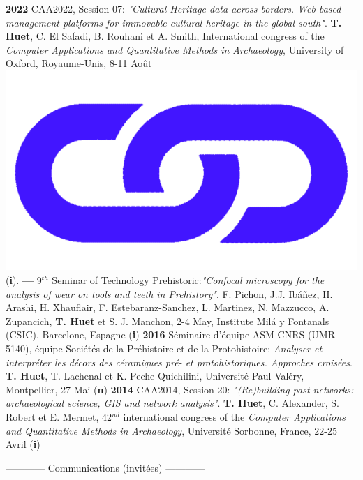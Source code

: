 \documentclass{article}
\newcommand{\fr}[1]{#1}       %
\newcommand{\en}[1]{}     %
\begin{document}
\textbf{2022 }CAA2022, Session 07: \textit{"Cultural Heritage data across borders. Web-based management platforms for immovable cultural heritage in the global south"}. \textbf{T. Huet}, C. El Safadi, B. Rouhani et A. Smith, International congress of the \textit{Computer Applications and Quantitative Methods in Archaeology}, University of Oxford, Royaume-Unis, 8-11 Août \href{https://eamena-project.github.io/reveal.js/projects/caa22s07.html}{\includegraphics[scale=0.015]{link_darkblue.png}} (\textbf{i}). 
\smallbreak
\textbf{--- }9${}^{th}$ Seminar of Technology Prehistoric:\textit{"Confocal microscopy for the analysis of wear on tools and teeth in Prehistory"}. F. Pichon, J.J. Ibáñez, H. Arashi, H. Xhauflair, F. Estebaranz-Sanchez, L. Martinez, N. Mazzucco, A. Zupancich, \textbf{T. Huet} et S. J. Manchon, 2-4 May, Institute Milá y Fontanals (CSIC), Barcelone, Espagne (\textbf{i})
\smallbreak
\textbf{2016 }S\'{e}minaire d'\'{e}quipe ASM-CNRS (UMR 5140), \'{e}quipe Soci\'{e}t\'{e}s de la Pr\'{e}histoire et de la Protohistoire: \textit{Analyser et interpr\'{e}ter les d\'{e}cors des c\'{e}ramiques pr\'{e}- et protohistoriques. Approches crois\'{e}es}. \textbf{T. Huet}, T. Lachenal et K. Peche-Quichilini, Universit\'{e} Paul-Val\'{e}ry, Montpellier, 27 Mai (\textbf{n})
\smallbreak
\textbf{2014 }CAA2014, Session 20: \textit{"(Re)building past networks: archaeological science, GIS and network analysis"}. \textbf{T. Huet}, C. Alexander, S. Robert et E. Mermet, 42${}^{nd}$ international congress of the \textit{Computer Applications and Quantitative Methods in Archaeology}, Universit\'{e} Sorbonne, France, 22-25 Avril (\textbf{i})
\bigbreak

\begin{center}
\fr{------------ Communications (invitées) ------------}
\en{------------ Invited Talks ------------}
\end{center}
\smallbreak
	
\end{document}
